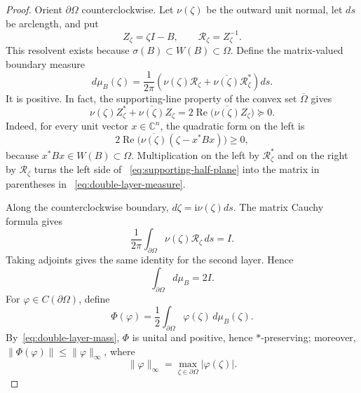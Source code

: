 \documentclass[preprints,article,submit,oneauthor]{Definitions/mdpi}
\theoremstyle{mdpi}
\theoremstyle{definition}
\newcommand{\C}{\mathbb C}
\newcommand{\RePart}{\operatorname{Re}}
\newcommand{\iu}{\mathrm{i}}
\begin{document}
\begin{proof}
Orient $\partial\Omega$ counterclockwise.  Let $\nu(\zeta)$ be the
outward unit normal, let $ds$ be arclength, and put
\[
  Z_\zeta=\zeta I-B,
  \qquad
  \mathcal R_\zeta=Z_\zeta^{-1}.
\]
This resolvent exists because
$\sigma(B)\subset W(B)\subset\Omega$.  Define the matrix-valued
boundary measure
\begin{equation}
  d\mu_B(\zeta)=\frac{1}{2\pi}
  \left(
    \nu(\zeta)\mathcal R_\zeta+
    \overline{\nu(\zeta)}\mathcal R_\zeta^*
  \right)ds.
  \label{eq:double-layer-measure}
\end{equation}
It is positive.  In fact, the supporting-line property of the convex
set $\overline\Omega$ gives
\begin{equation}
  \nu(\zeta)Z_\zeta^*+\overline{\nu(\zeta)}Z_\zeta
  =2\RePart\bigl(\overline{\nu(\zeta)}Z_\zeta\bigr)\succeq0.
  \label{eq:supporting-half-plane}
\end{equation}
Indeed, for every unit vector $x\in\C^n$, the quadratic form on the
left is
\[
  2\RePart\bigl(\overline{\nu(\zeta)}
  (\zeta-x^*Bx)\bigr)\geq0,
\]
because $x^*Bx\in W(B)\subset\Omega$.
Multiplication on the left by $\mathcal R_\zeta^*$ and on the right by
$\mathcal R_\zeta$ turns the left side of~%
\eqref{eq:supporting-half-plane} into the matrix in parentheses in~%
\eqref{eq:double-layer-measure}.

Along the counterclockwise boundary,
$d\zeta=\iu\nu(\zeta)ds$.  The matrix Cauchy formula gives
\begin{equation}
  \frac{1}{2\pi}\int_{\partial\Omega}
  \nu(\zeta)\mathcal R_\zeta\,ds=I.
  \label{eq:first-layer-mass}
\end{equation}
Taking adjoints gives the same identity for the second layer.  Hence
\begin{equation}
  \int_{\partial\Omega}d\mu_B=2I.
  \label{eq:double-layer-mass}
\end{equation}
For $\varphi\in C(\partial\Omega)$, define
\begin{equation}
  \Phi(\varphi)=\frac12
  \int_{\partial\Omega}\varphi(\zeta)\,d\mu_B(\zeta).
  \label{eq:Phi-definition}
\end{equation}
By~\eqref{eq:double-layer-mass}, $\Phi$ is unital and positive, hence
$*$-preserving; moreover,
$\lVert\Phi(\varphi)\rVert\leq\lVert\varphi\rVert_\infty$, where
\[
  \lVert\varphi\rVert_\infty
  =\max_{\zeta\in\partial\Omega}\lvert\varphi(\zeta)\rvert.
\]


\end{proof}
\end{document}
